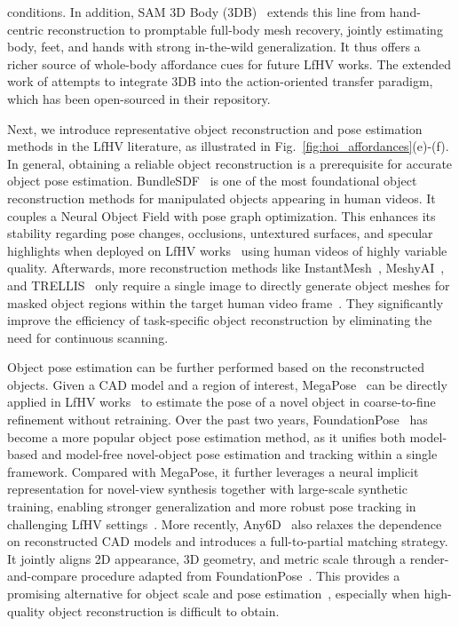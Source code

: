 \documentclass[Afour,sageh,times]{sagej}
\begin{document}
conditions. In addition, SAM 3D Body (3DB)~\citep{yang2026sam} extends this line from hand-centric reconstruction to promptable full-body mesh recovery, jointly estimating body, feet, and hands with strong in-the-wild generalization. It thus offers a richer source of whole-body affordance cues for future LfHV works. The extended work of \cite{ma2025uni} attempts to integrate 3DB into the action-oriented transfer paradigm, which has been open-sourced in their repository.

Next, we introduce representative object reconstruction and pose estimation methods in the LfHV literature, as illustrated in Fig.~\ref{fig:hoi_affordances}(e)-(f). In general, obtaining a reliable object reconstruction is a prerequisite for accurate object pose estimation. BundleSDF~\citep{wen2023bundlesdf} is one of the most foundational object reconstruction methods for manipulated objects appearing in human videos. It couples a Neural Object Field with pose graph optimization. This enhances its stability regarding pose changes, occlusions, untextured surfaces, and specular highlights when deployed on LfHV works~\citep{chen2024vlmimic,patel2025robotic,hsu2025spot} using human videos of highly variable quality. Afterwards, more reconstruction methods like InstantMesh~\citep{xu2024instantmesh}, MeshyAI~\citep{meshyai}, and TRELLIS~\citep{xiang2025structured} only require a single image to directly generate object meshes for masked object regions within the target human video frame~\citep{chen2025web2grasp,ye2025video2policy,hsieh2025dexman,soraki2026objectforesight,chen2026dexterous}. They significantly improve the efficiency of task-specific object reconstruction by eliminating the need for continuous scanning.

Object pose estimation can be further performed based on the reconstructed objects. Given a CAD model and a region of interest, MegaPose~\citep{labbe2022megapose} can be directly applied in LfHV works~\citep{liang2024dreamitate,patel2025robotic} to estimate the pose of a novel object in coarse-to-fine refinement without retraining. Over the past two years, FoundationPose~\citep{wen2024foundationpose} has become a more popular object pose estimation method, as it unifies both model-based and model-free novel-object pose estimation and tracking within a single framework. Compared with MegaPose, it further leverages a neural implicit representation for novel-view synthesis together with large-scale synthetic training, enabling stronger generalization and more robust pose tracking in challenging LfHV settings~\citep{chen2024vlmimic,yuan2025hermes,hsieh2025dexman,mao2025robot,lum2025crossing,hsu2025spot,patel2025robotic,soraki2026objectforesight,fan2026robopaint,zou2026activeglasses}. More recently, Any6D~\citep{lee2025any6d} also relaxes the dependence on reconstructed CAD models and introduces a full-to-partial matching strategy. It jointly aligns 2D appearance, 3D geometry, and metric scale through a render-and-compare procedure adapted from FoundationPose~\citep{wen2024foundationpose}. This provides a promising alternative for object scale and pose estimation~\citep{hsieh2025dexman}, especially when high-quality object reconstruction is difficult to obtain.
\end{document}
